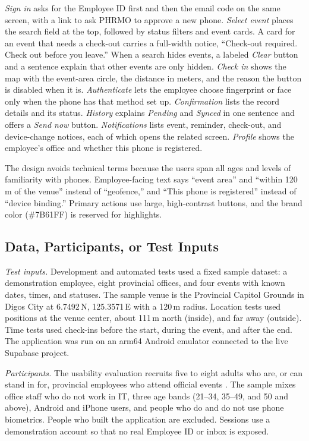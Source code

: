 \documentclass[conference]{IEEEtran}
\begin{document}
\textit{Sign in} asks for the Employee ID first and then the email code
on the same screen, with a link to ask PHRMO to approve a new phone.
\textit{Select event} places the search field at the top, followed by
status filters and event cards. A card for an event that needs a
check-out carries a full-width notice, ``Check-out required. Check out
before you leave.'' When a search hides events, a labeled
\textit{Clear} button and a sentence explain that other events are only
hidden. \textit{Check in} shows the map with the event-area circle, the
distance in meters, and the reason the button is disabled when it is.
\textit{Authenticate} lets the employee choose fingerprint or face only
when the phone has that method set up. \textit{Confirmation} lists the
record details and its status. \textit{History} explains
\textit{Pending} and \textit{Synced} in one sentence and offers a
\textit{Send now} button. \textit{Notifications} lists event, reminder,
check-out, and device-change notices, each of which opens the related
screen. \textit{Profile} shows the employee's office and whether this
phone is registered.

The design avoids technical terms because the users span all ages and
levels of familiarity with phones. Employee-facing text says ``event
area'' and ``within 120 m of the venue'' instead of ``geofence,'' and
``This phone is registered'' instead of ``device binding.'' Primary
actions use large, high-contrast buttons, and the brand color
(\#7B61FF) is reserved for highlights.

\subsection{Data, Participants, or Test Inputs}

\textit{Test inputs.} Development and automated tests used a fixed
sample dataset: a demonstration employee, eight provincial offices, and
four events with known dates, times, and statuses. The sample venue is
the Provincial Capitol Grounds in Digos City at
6.7492\textdegree{}\,N, 125.3571\textdegree{}\,E with a 120\,m radius.
Location tests used positions at the venue center, about 111\,m north
(inside), and far away (outside). Time tests used check-ins before the
start, during the event, and after the end. The application was run on
an arm64 Android emulator connected to the live Supabase project.

\textit{Participants.} The usability evaluation recruits five to eight
adults who are, or can stand in for, provincial employees who attend
official events \cite{virzi1992subjects}. The sample mixes office
staff who do not work in IT, three age bands (21--34, 35--49, and 50 and
above), Android and iPhone users, and people who do and do not use
phone biometrics. People who built the application are excluded.
Sessions use a demonstration account so that no real Employee ID or
inbox is exposed.
\end{document}
